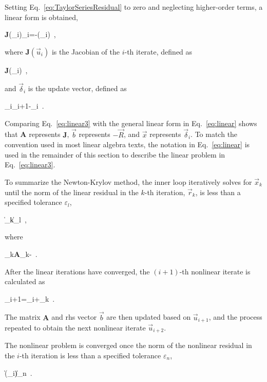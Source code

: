 \noindent Setting Eq.\ \eqref{eq:TaylorSeriesResidual} to zero and neglecting higher-order terms, a linear form is obtained,

\beq
\label{eq:linear3}
\textbf{J}(_i)\vec{\delta}_i=-(_i)\ ,
\eeq

\noindent where \(\textbf{J}(\vec{u}_i)\) is the Jacobian of the \(i\)-th iterate, defined as

\beq
\label{eq:JacobianDef}
\textbf{J}(_i)\equiv{}\ ,
\eeq

\noindent and \(\vec{\delta}_i\) is the update vector, defined as

\beq
\label{eq:update}
\vec{\delta}_i\equiv{}_{i+1}-_i\ .
\eeq

\noindent Comparing Eq.\ \eqref{eq:linear3} with the general linear form in Eq.\ \eqref{eq:linear} shows that \textbf{A} represents \(\textbf{J}\), \(\vec{b}\) represents \(-\vec{R}\), and \(\vec{x}\) represents \(\vec{\delta}_i\). To match the convention used in most linear algebra texts, the notation in Eq.\ \eqref{eq:linear} is used in the remainder of this section to describe the linear problem in Eq.\ \eqref{eq:linear3}.

To summarize the Newton-Krylov method, the inner loop iteratively solves for \(\vec{x}_k\) until the norm of the linear residual in the \(k\)-th iteration, \(\vec{r}_k\), is less than a specified tolerance \(\varepsilon_l\),

\beq
\label{eq:convergence_linear}
\|_k\|\leq\varepsilon_l\ ,
\eeq 

\noindent where

\beq
\label{eq:linear_residual}
_k\equiv\textbf{A}_k-\ .
\eeq

\noindent After the linear iterations have converged, the \((i+1)\)-th nonlinear iterate is calculated as

\beq
{}_{i+1}=_i+_k\ .
\eeq

\noindent The matrix \(\textbf{A}\) and \gls{rhs} vector \(\vec{b}\) are then updated based on \(\vec{u}_{i+1}\), and the process repeated to obtain the next nonlinear iterate \(\vec{u}_{i+2}\). 

The nonlinear problem is converged once the norm of the nonlinear residual in the \(i\)-th iteration is less than a specified tolerance \(\varepsilon_n\),

\beq
\|(_i)\|\leq\varepsilon_n\ .
\eeq

